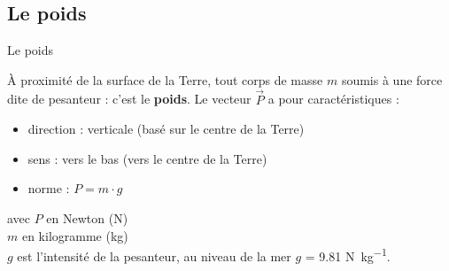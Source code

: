 \documentclass{beamer}
\begin{document}
\subsection{Le poids}
    \begin{frame}{Le poids}

    \begin{minipage}{.6\linewidth}
    À proximité de la surface de la Terre, tout corps de masse $m$ soumis à une force dite de pesanteur : c'est le \textbf{poids}. Le vecteur $\vec{P}$ a pour caractéristiques :
    \begin{itemize}
        \item[$-$] direction : verticale (basé sur le centre de la Terre)
        \item[$-$] sens : vers le bas (vers le centre de la Terre)
        \item[$-$] norme : $P=m\cdot g$
    \end{itemize}
    avec $P$ en Newton (N)\\
    $m$ en kilogramme (kg)\\
    $g$ est l'intensité de la pesanteur, au niveau de la mer $g$ = \num{9,81} \unit{\newton\per\kilo\gram}.
    \end{minipage}
    \begin{minipage}{.35\linewidth}
    \centering
    \end{minipage}  
    \end{frame}
    
\end{document}
